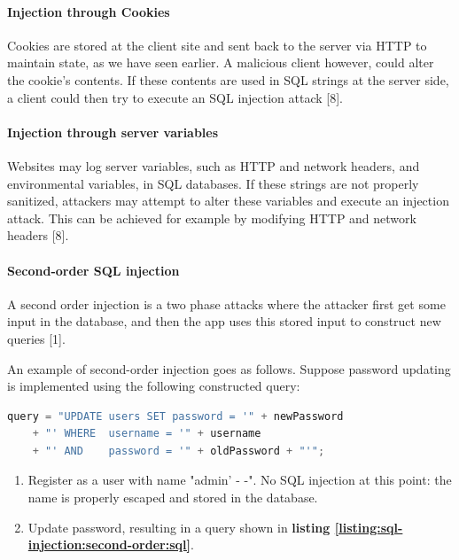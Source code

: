 \paragraph{Injection through Cookies}

Cookies are stored at the client site and sent back to the server via HTTP to maintain state, as we have seen earlier. A malicious client however, could alter the cookie's contents. If these contents are used in SQL strings at the server side, a client could then try to execute an SQL injection attack [8].


\paragraph{Injection through server variables}

Websites may log server variables, such as HTTP and network headers, and environmental variables, in SQL databases. If these strings are not properly sanitized, attackers may attempt to alter these variables and execute an injection attack. This can be achieved for example by modifying HTTP and network headers [8].


\paragraph{Second-order SQL injection}

A second order injection is a two phase attacks where the attacker first get some input in the database, and then the app uses this stored input to construct new queries [1].

An example of second-order injection goes as follows. Suppose password updating is implemented using the following constructed query:

\begin{lstlisting}[language=java, caption=Query for updating the password of a user{,} where username is loaded from the database., label=listing:sql-injection:second-order:javascript]
query = "UPDATE users SET password = '" + newPassword
    + "' WHERE  username = '" + username
	+ "' AND    password = '" + oldPassword + "'";
\end{lstlisting}


\begin{enumerate}[Step 1.]
	\item  Register as a user with name "admin' - -". No SQL injection at this point: the name is properly escaped and stored in the database.
	\item Update password, resulting in a query shown in \textbf{listing \ref{listing:sql-injection:second-order:sql}}.
\end{enumerate}

